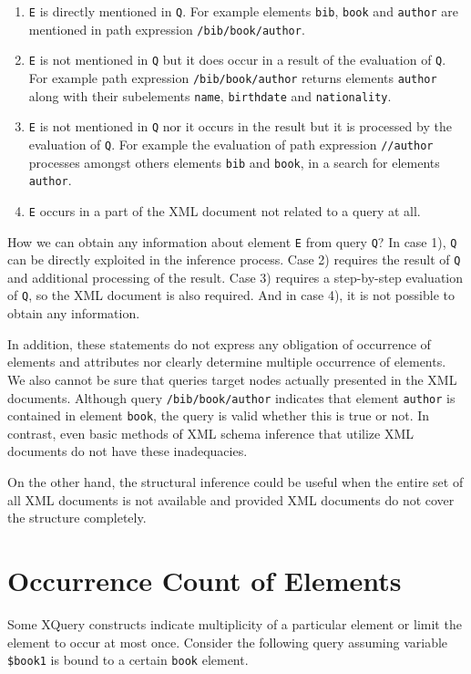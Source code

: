 \begin{enumerate}[1)]
\item \texttt{E} is directly mentioned in \texttt{Q}. For example elements \texttt{bib}, \texttt{book} and \texttt{author} are mentioned in path expression \texttt{/bib/book/author}.
\item \texttt{E} is not mentioned in \texttt{Q} but it does occur in a result of the evaluation of \texttt{Q}. For example path expression \texttt{/bib/book/author} returns elements \texttt{author} along with their subelements \texttt{name}, \texttt{birthdate} and \texttt{nationality}.
\item \texttt{E} is not mentioned in \texttt{Q} nor it occurs in the result but it is processed by the evaluation of \texttt{Q}. For example the evaluation of path expression \texttt{//author} processes amongst others elements \texttt{bib} and \texttt{book}, in a search for elements \texttt{author}.
\item \texttt{E} occurs in a part of the XML document not related to a query at all.
\end{enumerate}

How we can obtain any information about element \texttt{E} from query \texttt{Q}? In case 1), \texttt{Q} can be directly exploited in the inference process. Case 2) requires the result of \texttt{Q} and additional processing of the result. Case 3) requires a step-by-step evaluation of \texttt{Q}, so the XML document is also required. And in case 4), it is not possible to obtain any information. 

In addition, these statements do not express any obligation of occurrence of elements and attributes nor clearly determine multiple occurrence of elements. We also cannot be sure that queries target nodes actually presented in the XML documents. Although query \texttt{/bib/book/author} indicates that element \texttt{author} is contained in element \texttt{book}, the query is valid whether this is true or not. In contrast, even basic methods of XML schema inference that utilize XML documents do not have these inadequacies.

On the other hand, the structural inference could be useful when the entire set of all XML documents is not available and provided XML documents do not cover the structure completely.

\section{Occurrence Count of Elements}
Some XQuery constructs indicate multiplicity of a particular element or limit the element to occur at most once. Consider the following query assuming variable \texttt{\$book1} is bound to a certain \texttt{book} element.

